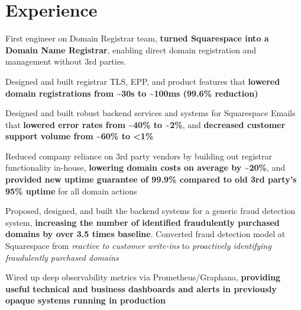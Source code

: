 \documentclass[]{two-column-resume}
\begin{document}
\begin{minipage}[t]{0.65\textwidth}

\section{Experience}


 \vspace{\topsep} %

\begin{tightemize}
\item First engineer on Domain Registrar team, \textbf{turned Squarespace into a Domain Name Registrar}, enabling direct domain registration and management without 3rd parties.
\item Designed and built registrar TLS, EPP, and product features that \textbf{lowered domain registrations from \textasciitilde 30s to \textasciitilde 100ms (99.6\% reduction)}
\item Designed and built robust backend services and systems for Squarespace Emails that \textbf{lowered error rates from \textasciitilde 40\% to \textasciitilde 2\%}, and \textbf{decreased customer support volume from \textasciitilde 60\% to <1\%}
\item Reduced company reliance on 3rd party vendors by building out registrar functionality in-house, \textbf{lowering domain costs on average by \textasciitilde 20\%}, and \textbf{provided new uptime guarantee of 99.9\% compared to old 3rd party's 95\% uptime} for all domain actions
\item Proposed, designed, and built the backend systems for a generic fraud detection system, \textbf{increasing the number of identified fraudulently purchased domains by over 3.5 times baseline}. Converted fraud detection model at Squarespace from \textit{reactive to customer write-ins} to \textit{proactively identifying fraudulently purchased domains}
\item Wired up deep observability metrics via Prometheus/Graphana, \textbf{providing useful technical and business dashboards and alerts in previously opaque systems running in production}
\end{tightemize}
\sectionsep


\end{minipage}
\end{document}
